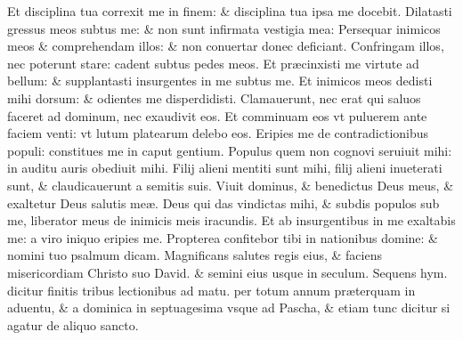 \documentclass[a5paper,10pt]{book}
\def\ae{æ}
\begin{document}
\begin{multicols*}{2}
\newline \color{red} E\color{black}t disciplina tua correxit me in finem: \& disciplina tua ipsa me docebit.
\newline \color{red} D\color{black}ilatasti gressus meos subtus me: \& non sunt infirmata vestigia mea:
\newline \color{red} P\color{black}ersequar inimicos meos \& comprehendam illos: \& non conuertar donec deficiant.
\newline \color{red} C\color{black}onfringam illos, nec poterunt stare: cadent subtus pedes meos.
\newline \color{red} E\color{black}t pr\ae cinxisti me virtute ad bellum: \& supplantasti insurgentes in me subtus me.
\newline \color{red} E\color{black}t inimicos meos dedisti mihi dorsum: \& odientes me disperdidisti.
\newline \color{red} C\color{black}lamauerunt, nec erat qui saluos faceret ad dominum, nec exaudivit eos.
\newline \color{red} E\color{black}t comminuam eos vt puluerem ante faciem venti: vt lutum platearum delebo eos.%
\newline \color{red} E\color{black}ripies me de contradictionibus populi: constitues me in caput gentium.
\newline \color{red} P\color{black}opulus quem non cognovi seruiuit mihi: in auditu auris obediuit mihi.
\newline \color{red} F\color{black}ilij alieni mentiti sunt mihi, filij alieni inueterati sunt, \& claudicauerunt a semitis suis.
\newline \color{red} V\color{black}iuit dominus, \& benedictus Deus meus, \& exaltetur Deus salutis me\ae .
\newline \color{red} D\color{black}eus qui das vindictas mihi, \& subdis populos sub me, liberator meus de inimicis meis iracundis.
\newline \color{red} E\color{black}t ab insurgentibus in me exaltabis me: a viro iniquo eripies me.
\newline \color{red} P\color{black}ropterea confitebor tibi in nationibus domine: \& nomini tuo psalmum dicam.
\newline \color{red} M\color{black}agnificans salutes regis eius, \& faciens misericordiam Christo suo David. \& semini eius usque in seculum.
\newline {} \color{red} Sequens hym. dicitur %
finitis tribus lectionibus ad matu. per totum annum pr\ae terquam in aduentu, \& a dominica in septuagesima vsque ad Pascha, \& etiam tunc dicitur si agatur de aliquo sancto. \color{black}

\end{multicols*}
\end{document}
